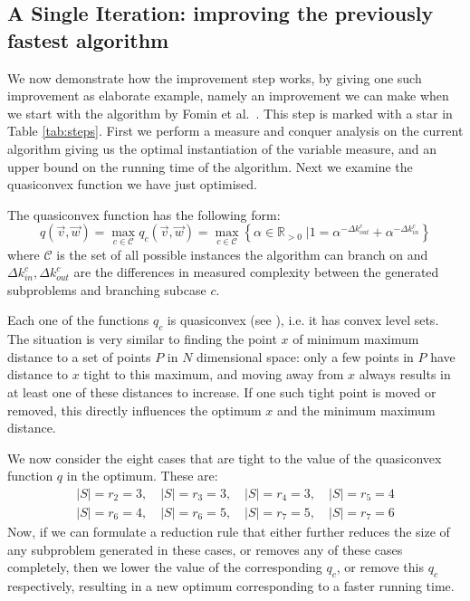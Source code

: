\documentclass[fleqn]{stacs_proc}
\begin{document}
\subsection{A Single Iteration: improving the previously fastest algorithm}
We now demonstrate how the improvement step works, by giving one such
improvement as elaborate example, namely an improvement we can make when we
start with the algorithm by Fomin et al.~\cite{FominGK05a}.
This step is marked with a star in Table \ref{tab:steps}.
First we perform a measure and conquer analysis on the current algorithm
giving us the optimal instantiation of the variable measure,
and an upper bound on the running time of the algorithm.
Next we examine the quasiconvex function we have just optimised.

The quasiconvex function has the following form:
\[ q(\vec{v}, \vec{w}) = \max_{c \in \mathcal{C}} q_c(\vec{v}, \vec{w})= \max_{c \in \mathcal{C}} \left\{ \alpha \in \mathbb{R}_{>0} \; | 1 = \alpha^{-\Delta k_{out}^c} + \alpha^{-\Delta k_{in}^c} \right\} \]
where $\mathcal{C}$ is the set of all possible instances the algorithm can branch on
and $\Delta k_{in}^c, \Delta k_{out}^c$ are the differences in measured complexity between
the generated subproblems and branching subcase $c$.

Each one of the functions $q_c$ is quasiconvex (see \cite{Eppstein04}), i.e. it has convex level sets.
The situation is very similar to finding the point $x$ of minimum maximum distance to
a set of points $P$ in $N$ dimensional space:
only a few points in $P$ have distance to $x$ tight to this maximum,
and moving away from $x$ always results in at least one of these distances to increase.
If one such tight point is moved or removed, this directly influences the optimum $x$ and the minimum maximum distance.



We now consider the eight cases that are tight to the value of the 
quasiconvex function $q$ in the optimum.
These are:
\begin{eqnarray}
|S|=r_2=3, \quad |S|=r_3=3, \quad |S|=r_4=3, \quad |S|=r_5=4 \nonumber \\
|S|=r_6=4, \quad |S|=r_6=5, \quad |S|=r_7=5, \quad |S|=r_7=6 \nonumber
\end{eqnarray}
Now, if we can formulate a reduction rule that either further reduces the size of any subproblem generated in these cases,
or removes any of these cases completely, then we lower the value of the corresponding $q_c$,
or remove this $q_c$ respectively, resulting in a new optimum corresponding to a faster running time.
\end{document}
